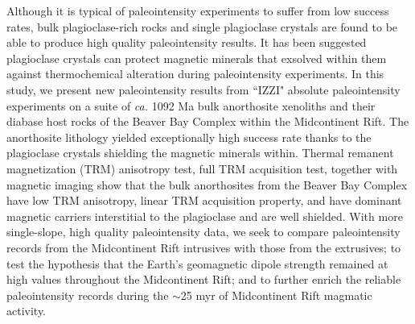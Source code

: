 \documentclass[draft]{agujournal2019}
\begin{document}
Although it is typical of paleointensity experiments to suffer from low success rates, bulk plagioclase-rich rocks \cite{Selkin2000a} and single plagioclase crystals \cite{Tarduno2005a} are found to be able to produce high quality paleointensity results. It has been suggested plagioclase crystals can protect magnetic minerals that exsolved within them against thermochemical alteration during paleointensity experiments. In this study, we present new paleointensity results from ``IZZI" absolute paleointensity experiments \cite{Yu2004a} on a suite of \textit{ca.} 1092 Ma bulk anorthosite xenoliths and their diabase host rocks of the Beaver Bay Complex within the Midcontinent Rift. The anorthosite lithology yielded exceptionally high success rate thanks to the plagioclase crystals shielding the magnetic minerals within. Thermal remanent magnetization (TRM) anisotropy test, full TRM acquisition test, together with magnetic imaging show that the bulk anorthosites from the Beaver Bay Complex have low TRM anisotropy, linear TRM acquisition property, and have dominant magnetic carriers interstitial to the plagioclase and are well shielded. With more single-slope, high quality paleointensity data, we seek to compare paleointensity records from the Midcontinent Rift intrusives with those from the extrusives; to test the hypothesis that the Earth's geomagnetic dipole strength remained at high values throughout the Midcontinent Rift; and to further enrich the reliable paleointensity records during the $\sim$25 myr of Midcontinent Rift magmatic activity. 


\end{document}
